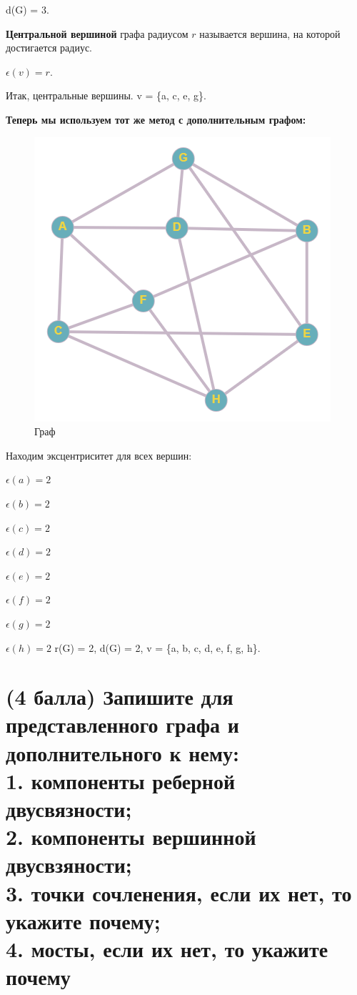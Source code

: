\documentclass{article}
\begin{document}
\bigskip
 d(G) = 3.

\bigskip
\textbf{Центральной вершиной} графа радиусом $r$ называется вершина, на которой достигается радиус.

${\displaystyle \epsilon (v)=r}.$

\bigskip


Итак, центральные вершины.  v =  \{a, c, e, g\}.

\bigskip

\Large\textbf{Теперь мы используем тот же метод с дополнительным графом:}
\bigskip
\begin{figure}[h]
    \centering
    \includegraphics[width=.6\textwidth]{3extra.png}
    \caption{Граф}
    \label{fig:my_label}
\end{figure}

Находим эксцентриситет для всех вершин:

$\epsilon(a) = 2$

$\epsilon(b) = 2$

$\epsilon(c) = 2$

$\epsilon(d) = 2$

$\epsilon(e) = 2$

$\epsilon(f) = 2$

$\epsilon(g) = 2$

$\epsilon(h) = 2$
 \newline
r(G) = 2, d(G) = 2, v = \{a, b, c, d, e, f, g, h\}.

\section{\Large{ (4 балла) Запишите для представленного графа и дополнительного к нему: \\ 1. компоненты реберной двусвязности;
 \\2. компоненты вершинной двусвзяности; \\ 3. точки сочленения, если их нет, то укажите почему; \\ 4. мосты, если их нет, то укажите почему
}}
\end{document}
